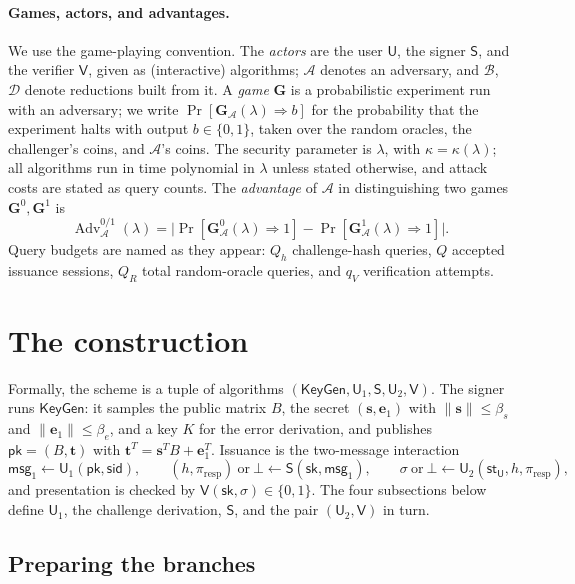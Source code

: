 \documentclass[11pt]{article}
\newcommand{\Adv}{\operatorname{Adv}}
\newcommand{\Gm}{\mathbf{G}}
\newcommand{\U}{\mathsf{U}}
\renewcommand{\S}{\mathsf{S}}
\newcommand{\Vrf}{\mathsf{V}}
\begin{document}
\paragraph{Games, actors, and advantages.}
We use the game-playing convention.  The \emph{actors} are the user $\U$,
the signer $\S$, and the verifier $\Vrf$, given as (interactive) algorithms;
$\mathcal A$ denotes an adversary, and $\mathcal B$, $\mathcal D$ denote
reductions built from it.  A \emph{game} $\Gm$ is a probabilistic
experiment run with an adversary; we write
$\Pr[\Gm_{\mathcal A}(\lambda)\Rightarrow b]$ for the probability that the
experiment halts with output $b\in\{0,1\}$, taken over the random oracles,
the challenger's coins, and $\mathcal A$'s coins.  The security parameter is
$\lambda$, with $\kappa=\kappa(\lambda)$; all algorithms run in time
polynomial in $\lambda$ unless stated otherwise, and attack costs are stated
as query counts.  The \emph{advantage} of $\mathcal A$ in distinguishing two
games $\Gm^{0},\Gm^{1}$ is
\[
 \Adv_{\mathcal A}^{0/1}(\lambda)
 =\bigl|\Pr[\Gm^{0}_{\mathcal A}(\lambda)\Rightarrow 1]
  -\Pr[\Gm^{1}_{\mathcal A}(\lambda)\Rightarrow 1]\bigr|.
\]
Query budgets are named as they appear: $Q_h$ challenge-hash queries, $Q$
accepted issuance sessions, $Q_R$ total random-oracle queries, and $q_V$
verification attempts.

\section{The construction}
\label{sec:construction}

Formally, the scheme is a tuple of algorithms
$(\mathsf{KeyGen},\U_{1},\S,\U_{2},\Vrf)$.  The signer runs
$\mathsf{KeyGen}$: it samples the public matrix $B$, the secret
$(\mathbf s,\mathbf e_{1})$ with $\|\mathbf s\|\le\beta_s$ and
$\|\mathbf e_1\|\le\beta_e$, and a key $K$ for the error derivation, and
publishes $\mathsf{pk}=(B,\mathbf t)$ with
$\mathbf t^{T}=\mathbf s^{T}B+\mathbf e_{1}^{T}$.
Issuance is the two-message interaction
\[
 \mathsf{msg}_{1}\leftarrow\U_{1}(\mathsf{pk},\mathsf{sid}),\qquad
 (h,\pi_{\mathrm{resp}})\ \text{or}\ \bot\leftarrow
   \S(\mathsf{sk},\mathsf{msg}_{1}),\qquad
 \sigma\ \text{or}\ \bot\leftarrow
   \U_{2}(\mathsf{st}_{\U},h,\pi_{\mathrm{resp}}),
\]
and presentation is checked by
$\Vrf(\mathsf{sk},\sigma)\in\{0,1\}$.  The four subsections below define
$\U_1$, the challenge derivation, $\S$, and the pair $(\U_2,\Vrf)$ in turn.

\subsection{Preparing the branches}
\end{document}

